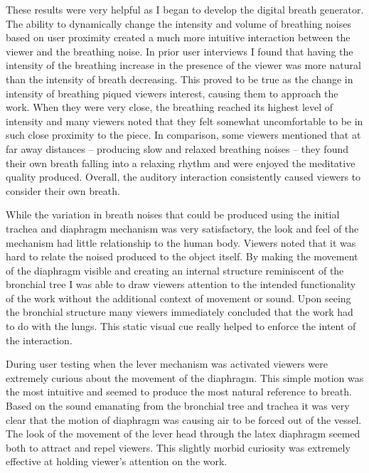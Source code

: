 \documentclass[letterpaper]{article}
\begin{document}
These results were very helpful as I began to develop the digital breath generator. The ability to dynamically change the intensity and volume of breathing noises based on user proximity created a much more intuitive interaction between the viewer and the breathing noise. In prior user interviews I found that having the intensity of the breathing increase in the presence of the viewer was more natural than the intensity of breath decreasing. This proved to be true as the change in intensity of breathing piqued viewers interest, causing them to approach the work. When they were very close, the breathing reached its highest level of intensity and many viewers noted that they felt somewhat uncomfortable to be in such close proximity to the piece. In comparison, some viewers mentioned that at far away distances -- producing slow and relaxed breathing noises -- they found their own breath falling into a relaxing rhythm and were enjoyed the meditative quality produced. Overall, the auditory interaction consistently caused viewers to consider their own breath. 

While the variation in breath noises that could be produced using the initial trachea and diaphragm mechanism was very satisfactory, the look and feel of the mechanism had little relationship to the human body. Viewers noted that it was hard to relate the noised produced to the object itself. By making the movement of the diaphragm visible and creating an internal structure reminiscent of the bronchial tree I was able to draw viewers attention to the intended functionality of the work without the additional context of movement or sound. Upon seeing the bronchial structure many viewers immediately concluded that the work had to do with the lungs. This static visual cue really helped to enforce the intent of the interaction.

During user testing when the lever mechanism was activated viewers were extremely curious about the movement of the diaphragm. This simple motion was the most intuitive and seemed to produce the most natural reference to breath. Based on the sound emanating from the bronchial tree and trachea it was very clear that the motion of diaphragm was causing air to be forced out of the vessel. The look of the movement of the lever head through the latex diaphragm seemed both to attract and repel viewers. This slightly morbid curiosity was extremely effective at holding viewer's attention on the work.  

\end{document}
